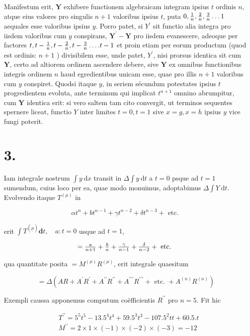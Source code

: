 \documentclass[twoside,12pt, showframe]{memoir}
\let\oldfrac\frac
\def\frac#1#2{\mathchoice{\tfrac{#1}{#2}}{\oldfrac{#1}{#2}}{\genfrac{}{}{}{2}{#1}{#2\mathstrut}}{\genfrac{}{}{}{3}{#1}{#2\mathstrut}}}
\begin{document}
Manifestum erit, \(\boldsymbol{Y}\) exhibere functionem algebraicam integram ipsius \(t\) ordinis \(n\), atque eius valores pro singulis \(n+1\) valoribus ipsius \(t\), puta \(0, \frac{1}{n}, \frac{2}{n}, \frac{3}{n} \ldots 1\) aequales esse valoribus ipsius \(y\). Porro patet, si \(Y^{\prime}\) sit functio alia integra pro iisdem valoribus cum \(y\) conspirans, \(\boldsymbol{Y}^{\prime}-\boldsymbol{Y}\) pro iisdem evanescere, adeoque per factores \(t, t-\frac{1}{n}, t-\frac{2}{n}, t-\frac{3}{n} \ldots . t-1\) et proin etiam per eorum productum (quod est ordinis: \(n+1\) ) divisibilem esse, unde patet, \(Y^{\prime}\), nisi prorsus identica sit cum \(\boldsymbol{Y}\), certo ad altiorem ordinem ascendere debere, sive \(\boldsymbol{Y}\) ex omnibus functionibus integris ordinem \(n\) haud egredientibus unicam esse, quae pro illis \(n+1\) valoribus cum \(y\) conspiret. Quodsi itaque \(y\), in seriem sécundum potestates ipsius \(t\) progredientem evoluta, ante terminum qui implicat \(t^{n+1}\) omnino abrumpitur, cum \(\boldsymbol{Y}\) identica erit: si vero saltem tam cito convergit, ut terminos sequentes spernere liceat, functio \(Y\) inter limites \(t=0, t=1\) sive \(x=g, x=h\) ipsius \(y\) vice fungi poterit.

\section*{3.}
Iam integrale nostrum \(\int y \mathrm{~d} x\) transit in \(\Delta \int y \mathrm{~d} t\) a \(t=0\) psque ad \(t=1\) sumendum, cuius loco per ea, quae modo monuimus, adoptabimus \(\Delta \int Y \mathrm{~d} t\). Evolvendo itaque \(T^{(\mu)}\) in

\[
\alpha t^{n}+b t^{n-1}+\gamma t^{n-2}+\delta t^{n-3}+\text { etc. }
\]

erit \(\int T^{(\underline{\mu})} \mathbf{d} t, \quad a: t=0\) usque ad \(t=1\),

\[
=\frac{a}{n+1}+\frac{b}{n}+\frac{\gamma}{n-1}+\frac{\delta}{n-2}+\text { etc. }
\]

qua quantitate posita \(=M^{(\mu)} R^{(\mu)}\), erit integrale quaesitum

\[
=\Delta\left(A R+A^{\prime} R^{\prime}+A^{\prime \prime} R^{\prime \prime}+A^{\prime \prime \prime} R^{\prime \prime \prime}+\text { etc. }+A^{(n)} R^{(n)}\right)
\]

Exempli caussa apponemus computum coëfficientis \(R^{\prime \prime}\) pro \(n=5\). Fit hic

\[
\begin{aligned}
& T^{\prime \prime}=5^{5} t^{5}-13.5^{4} t^{4}+59.5^{3} t^{3}-107.5^{2} t t+60.5 . t \\
& M^{\prime \prime}=2 \times 1 \times(-1) \times(-2) \times(-3)=-12
\end{aligned}
\]
\end{document}
